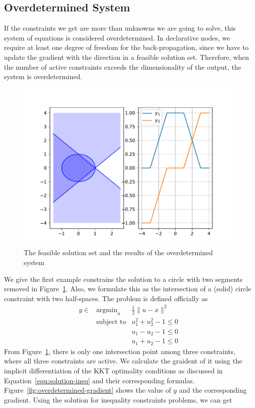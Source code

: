 \subsection{Overdetermined System}
If the constraints we get are more than unknowns we are going to solve, this system of equations is considered overdetermined. In declarative nodes, we require at least one degree of freedom for the back-propagation, since we have to update the gradient with the direction in a feasible solution set. Therefore, when the number of active constraints exceeds the dimensionality of the output, the system is overdetermined. 
\begin{figure}[t]
    \label{fig:overdetermined-solution}
    \centering
    \includegraphics[page=1, width=.8\textwidth]{figs/overdetermined.pdf}
    \caption{The feasible solution set and the results of the overdetermined system}
\end{figure}
\par We give the first example constrains the solution to a circle with two segments removed in Figure~\ref{fig:overdetermined-solution}. Also, we formulate this as the intersection of a (solid) circle constraint with two half-spaces. The problem is defined officially as 
\begin{equation}
    \begin{array}{lll}
        y \in & \text{argmin}_u & \frac{1}{2} \|u - x\|^2 \\
        & \text{subject to} & u_1^2 + u_2^2 - 1 \leq 0 \\
        & & u_1 - u_2 - 1 \leq 0 \\
        & & u_1 + u_2 - 1 \leq 0
    \end{array}
\end{equation}
From Figure~\ref{fig:overdetermined-solution}, there is only one intersection point among three constraints, where all three constraints are active. We calculate the graident of it using the implicit differentiation of the KKT optimality conditions as discussed in Equation~\ref{equ:solution-ineq} and their corresponding formulas. Figure~\ref{fig:overdetermined-gradient} shows the value of $y$ and the corresponding gradient. Using the solution for inequality constraints problems, we can get
